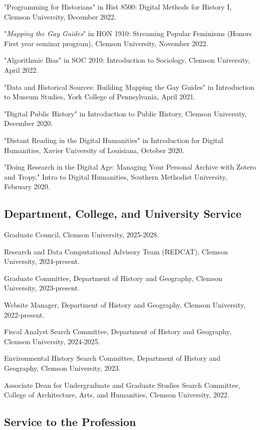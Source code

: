 \documentclass[11pt]{article}
\begin{document}
"Programming for Historians" in Hist 8500: Digital Methods for History I, Clemson University, December 2022.

"\emph{Mapping the Gay Guides}" in HON 1910: Streaming Popular Feminisms (Honors First year seminar program), Clemson University, November 2022. 

"Algorithmic Bias" in SOC 2010: Introduction to Sociology, Clemson University, April 2022.

"Data and Historical Sources: Building Mapping the Gay Guides" in Introduction to Museum Studies, York College of Pennsylvania, April 2021.

"Digital Public History" in Introduction to Public History, Clemson University, December 2020.

"Distant Reading in the Digital Humanities" in Introduction for Digital Humanities, Xavier University of Louisiana, October 2020.

"Doing Research in the Digital Age: Managing Your Personal Archive with Zotero and Tropy," Intro to Digital Humanities, Southern Methodist University, February 2020.

\subsection{Department, College, and University Service}\label{Department, College, and University Service}

Graduate Council, Clemson University, 2025-2028.

Research and Data Computational Advisory Team (REDCAT), Clemson University, 2024-present.

Graduate Committee, Department of History and Geography, Clemson University, 2023-present.

Website Manager, Department of History and Geography, Clemson University, 2022-present.

Fiscal Analyst Search Committee, Department of History and Geography, Clemson University, 2024-2025.

Environmental History Search Committee, Department of History and Geography, Clemson University, 2023.

Associate Dean for Undergraduate and Graduate Studies Search Committee, College of Architecture, Arts, and Humanities, Clemson University, 2022.

\subsection{Service to the Profession}\label{Service to the Profession}
\end{document}
